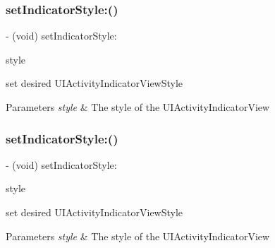 \subsubsection{\texorpdfstring{set\+Indicator\+Style\+:()}{setIndicatorStyle:()}\hspace{0.1cm}{\footnotesize\ttfamily [1/3]}}
{\footnotesize\ttfamily -\/ (void) set\+Indicator\+Style\+: \begin{DoxyParamCaption}\item[{(U\+I\+Activity\+Indicator\+View\+Style)}]{style }\end{DoxyParamCaption}}

set desired U\+I\+Activity\+Indicator\+View\+Style


\begin{DoxyParams}{Parameters}
{\em style} & The style of the U\+I\+Activity\+Indicator\+View \\
\hline
\end{DoxyParams}
\mbox{\label{category_u_i_image_view_07_web_cache_08_a951036cd5b2847b39b0e3a372423fa4e}} 
\subsubsection{\texorpdfstring{set\+Indicator\+Style\+:()}{setIndicatorStyle:()}\hspace{0.1cm}{\footnotesize\ttfamily [2/3]}}
{\footnotesize\ttfamily -\/ (void) set\+Indicator\+Style\+: \begin{DoxyParamCaption}\item[{(U\+I\+Activity\+Indicator\+View\+Style)}]{style }\end{DoxyParamCaption}}

set desired U\+I\+Activity\+Indicator\+View\+Style


\begin{DoxyParams}{Parameters}
{\em style} & The style of the U\+I\+Activity\+Indicator\+View \\
\hline
\end{DoxyParams}
\mbox{\label{category_u_i_image_view_07_web_cache_08_a951036cd5b2847b39b0e3a372423fa4e}} 
